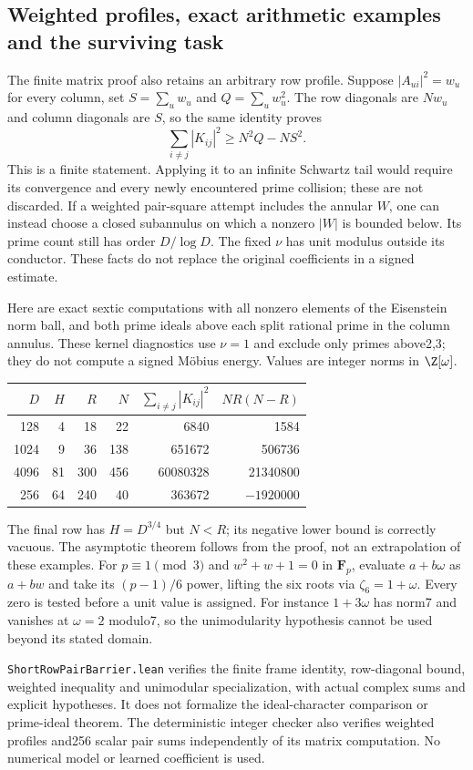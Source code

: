 \documentclass[11pt,oneside,openany]{book}
\theoremstyle{definition}\newtheorem{definition}[theorem]{Definition}
\theoremstyle{remark}\newtheorem{remark}[theorem]{Remark}
\begin{document}
\subsection{Weighted profiles, exact arithmetic examples and the surviving task}
The finite matrix proof also retains an arbitrary row profile. Suppose
$|A_{ui}|^2=w_u$ for every column, set $S=\sum_u w_u$ and
$Q=\sum_u w_u^2$. The row diagonals are $Nw_u$ and column diagonals are
$S$, so the same identity proves
\[
 \sum_{i\ne j}|K_{ij}|^2\ge N^2Q-NS^2.
\]
This is a finite statement. Applying it to an infinite Schwartz tail would
require its convergence and every newly encountered prime collision;
these are not discarded. If a weighted pair-square attempt includes the
annular $W$, one can instead choose a closed subannulus on which a nonzero
$|W|$ is bounded below. Its prime count still has order $D/\log D$.
The fixed $\nu$ has unit modulus outside its conductor. These facts do not
replace the original coefficients in a signed estimate.

Here are exact sextic computations with all nonzero elements of the
Eisenstein norm ball, and both prime ideals above each split rational prime
in the column annulus. These kernel diagnostics use $\nu=1$ and exclude
only primes above2,3; they do not compute a signed M\"obius energy.
Values are integer norms in $\Z[\omega]$.
\begin{center}\small
\begin{tabular}{rrrrrr}
$D$&$H$&$R$&$N$&$\sum_{i\ne j}|K_{ij}|^2$&$NR(N-R)$\\\hline
128&4&18&22&6840&1584\\
1024&9&36&138&651672&506736\\
4096&81&300&456&60080328&21340800\\
256&64&240&40&363672&$-1920000$
\end{tabular}
\end{center}
The final row has $H=D^{3/4}$ but $N<R$; its negative lower bound is
correctly vacuous. The asymptotic theorem follows from the proof, not an
extrapolation of these examples. For $p\equiv1\pmod3$ and
$w^2+w+1=0$ in $\mathbf F_p$, evaluate $a+b\omega$ as $a+bw$ and take
its $(p-1)/6$ power, lifting the six roots via $\zeta_6=1+\omega$.
Every zero is tested before a unit value is assigned. For instance
$1+3\omega$ has norm7 and vanishes at $\omega=2$ modulo7, so the
unimodularity hypothesis cannot be used beyond its stated domain.

\texttt{ShortRowPairBarrier.lean} verifies the finite frame identity,
row-diagonal bound, weighted inequality and unimodular specialization,
with actual complex sums and explicit hypotheses. It does not formalize
the ideal-character comparison or prime-ideal theorem. The deterministic
integer checker also verifies weighted profiles and256 scalar pair sums
independently of its matrix computation. No numerical model or learned
coefficient is used.
\end{document}
